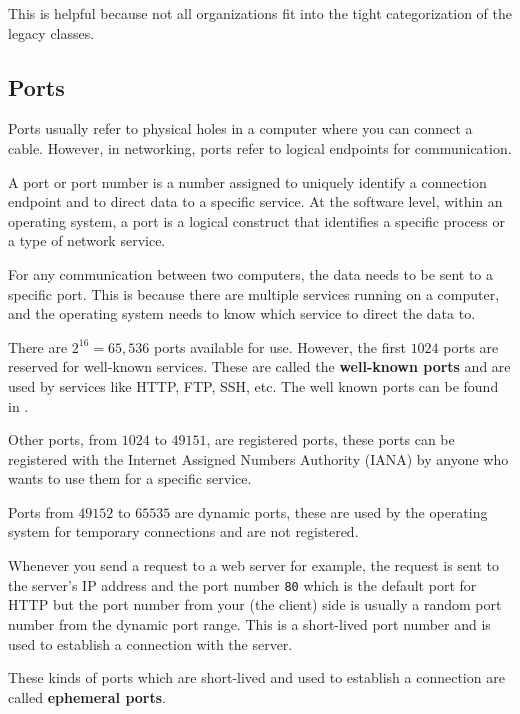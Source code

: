 This is helpful because not all organizations fit
into the tight categorization of the legacy classes.

\subsection{Ports}

Ports usually refer to physical holes in a computer
where you can connect a cable. However, in networking,
ports refer to logical endpoints for communication.

\begin{definition}[Port]
A port or port number is a number assigned to uniquely identify
a connection endpoint and to direct data to a specific service.
At the software level, within an operating system, a port is a
logical construct that identifies a specific process or a type
of network service.
\end{definition}

For any communication between two computers, the data
needs to be sent to a specific port. This is because
there are multiple services running on a computer, and
the operating system needs to know which service to
direct the data to.

There are $2^{16} = 65,536$ ports available for use.
However, the first $1024$ ports are reserved for
well-known services. These are called the \textbf{well-known
ports} and are used by services like HTTP, FTP, SSH, etc.
The well known ports can be found in .

Other ports, from $1024$ to $49151$, are registered ports,
these ports can be registered with the Internet Assigned
Numbers Authority (IANA) by anyone who wants to use them
for a specific service.

Ports from $49152$ to $65535$ are dynamic ports, these
are used by the operating system for temporary connections
and are not registered.

Whenever you send a request to a web server for example,
the request is sent to the server's IP address and the
port number \lstinline|80| which is the default port for
HTTP
but the port number from your (the client) side is
usually a random port number from the dynamic port range.
This is a short-lived port number and is used to
establish a connection with the server.

These kinds of ports which are short-lived and used
to establish a connection are called \textbf{ephemeral ports}.

